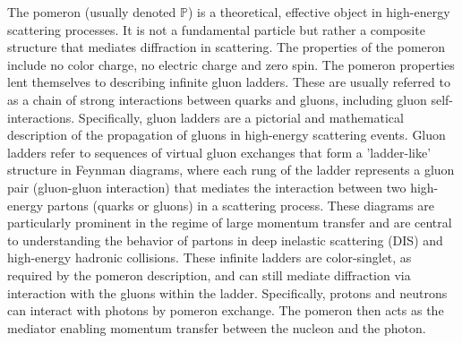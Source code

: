 The pomeron (usually denoted $\mathbb{P}$) is a theoretical, effective object in high-energy scattering processes. It is not a fundamental particle but rather a composite structure that mediates diffraction in scattering. The properties of the pomeron include no color charge, no electric charge and  zero spin. The pomeron properties lent themselves to describing infinite gluon ladders. These are usually referred to as a chain of strong interactions between quarks and gluons, including gluon self-interactions. Specifically, gluon ladders are a pictorial and mathematical description of the propagation of gluons in high-energy scattering events. Gluon ladders refer to sequences of virtual gluon exchanges that form a 'ladder-like' structure in Feynman diagrams, where each rung of the ladder represents a gluon pair (gluon-gluon interaction) that mediates the interaction between two high-energy partons (quarks or gluons) in a scattering process. These diagrams are particularly prominent in the regime of large momentum transfer and are central to understanding the behavior of partons in deep inelastic scattering (DIS) and high-energy hadronic collisions. These infinite ladders are color-singlet, as required by the pomeron description, and can still mediate diffraction via interaction with the gluons within the ladder. Specifically, protons and neutrons can interact with photons by pomeron exchange. The pomeron then acts as the mediator enabling momentum transfer between the nucleon and the photon.




